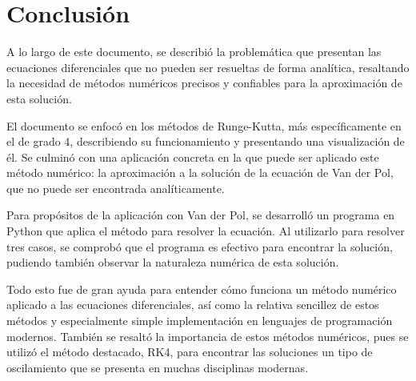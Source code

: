 \section{Conclusión}

A lo largo de este documento, se describió la problemática que presentan las ecuaciones diferenciales que no pueden ser resueltas de forma analítica, resaltando la necesidad de métodos numéricos precisos y confiables para la aproximación de esta solución.

El documento se enfocó en los métodos de Runge-Kutta, más específicamente en el de grado 4, describiendo su funcionamiento y presentando una visualización de él. Se culminó con una aplicación concreta en la que puede ser aplicado este método numérico: la aproximación a la solución de la ecuación de Van der Pol, que no puede ser encontrada analíticamente.

Para propósitos de la aplicación con Van der Pol, se desarrolló un programa en Python que aplica el método para resolver la ecuación. Al utilizarlo para resolver tres casos, se comprobó que el programa es efectivo para encontrar la solución, pudiendo también observar la naturaleza numérica de esta solución.

Todo esto fue de gran ayuda para entender cómo funciona un método numérico aplicado a las ecuaciones diferenciales, así como la relativa sencillez de estos métodos y especialmente simple implementación en lenguajes de programación modernos. También se resaltó la importancia de estos métodos numéricos, pues se utilizó el método destacado, RK4, para encontrar las soluciones un tipo de oscilamiento que se presenta en muchas disciplinas modernas.
